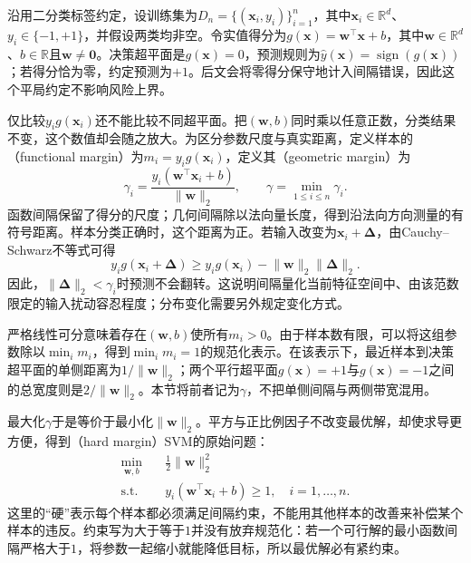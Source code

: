 沿用二分类标签约定，设训练集为$D_n=\{(\bm{x}_i,y_i)\}_{i=1}^n$，其中$\bm{x}_i\in\mathbb{R}^d$、$y_i\in\{-1,+1\}$，并假设两类均非空。令实值得分为$g(\bm{x})=\bm{w}^{\top}\bm{x}+b$，其中$\bm{w}\in\mathbb{R}^d$、$b\in\mathbb{R}$且$\bm{w}\ne\bm{0}$。决策超平面是$g(\bm{x})=0$，预测规则为$\hat y(\bm{x})=\operatorname{sign}(g(\bm{x}))$；若得分恰为零，约定预测为$+1$。后文会将零得分保守地计入间隔错误，因此这个平局约定不影响风险上界。

仅比较$y_i g(\bm{x}_i)$还不能比较不同超平面。把$(\bm{w},b)$同时乘以任意正数，分类结果不变，这个数值却会随之放大。为区分参数尺度与真实距离，定义样本的（functional margin）为$m_i=y_i g(\bm{x}_i)$，定义其（geometric margin）为
\begin{equation}
  \gamma_i
  =\frac{y_i(\bm{w}^{\top}\bm{x}_i+b)}
         {\lVert\bm{w}\rVert_2},
  \qquad
  \gamma=\min_{1\le i\le n}\gamma_i.
  \label{eq:classification-svm-margin}
\end{equation}
函数间隔保留了得分的尺度；几何间隔除以法向量长度，得到沿法向方向测量的有符号距离。样本分类正确时，这个距离为正。若输入改变为$\bm{x}_i+\bm{\Delta}$，由Cauchy--Schwarz不等式可得
\[
  y_i g(\bm{x}_i+\bm{\Delta})
  \ge y_i g(\bm{x}_i)
      -\lVert\bm{w}\rVert_2\lVert\bm{\Delta}\rVert_2.
\]
因此，$\lVert\bm{\Delta}\rVert_2<\gamma_i$时预测不会翻转。这说明间隔量化当前特征空间中、由该范数限定的输入扰动容忍程度；分布变化需要另外规定变化方式。

严格线性可分意味着存在$(\bm{w},b)$使所有$m_i>0$。由于样本数有限，可以将这组参数除以$\min_i m_i$，得到$\min_i m_i=1$的规范化表示。在该表示下，最近样本到决策超平面的单侧距离为$1/\lVert\bm{w}\rVert_2$；两个平行超平面$g(\bm{x})=+1$与$g(\bm{x})=-1$之间的总宽度则是$2/\lVert\bm{w}\rVert_2$。本节将前者记为$\gamma$，不把单侧间隔与两侧带宽混用。

最大化$\gamma$于是等价于最小化$\lVert\bm{w}\rVert_2$。平方与正比例因子不改变最优解，却使求导更方便，得到（hard margin）SVM的原始问题：
\begin{equation}
  \begin{aligned}
    \min_{\bm{w},b}\quad&
      \frac12\lVert\bm{w}\rVert_2^2\\
    \text{s.t.}\quad&
      y_i(\bm{w}^{\top}\bm{x}_i+b)\ge1,
      \quad i=1,\ldots,n.
  \end{aligned}
  \label{eq:classification-svm-hard-primal}
\end{equation}
这里的“硬”表示每个样本都必须满足间隔约束，不能用其他样本的改善来补偿某个样本的违反。约束写为大于等于$1$并没有放弃规范化：若一个可行解的最小函数间隔严格大于$1$，将参数一起缩小就能降低目标，所以最优解必有紧约束。

